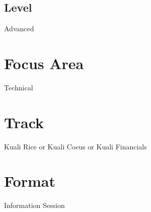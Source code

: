\documentclass[12pt,notitlepage]{article}
\begin{document}
\subsection{Level}
Advanced

\section{Focus Area}
Technical

\section{Track}
Kuali Rice or Kuali Coeus or Kuali Financials

\section{Format}
Information Session
\end{document}
